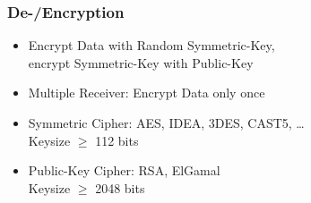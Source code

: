 \documentclass{beamer}
\begin{document}

\begin{frame}

	\frametitle{De-/Encryption}


	\begin{itemize}
		\item Encrypt Data with Random Symmetric-Key,\\ encrypt Symmetric-Key with Public-Key
		\item Multiple Receiver: Encrypt Data only once 
	\end{itemize}
		
	\begin{itemize}
		\item Symmetric Cipher: AES, IDEA, 3DES, CAST5, \ldots  \\
				\small Keysize $\geq$ 112 bits \cite{nist} 
		\item Public-Key Cipher: RSA, ElGamal \\
				\small Keysize $\geq$ 2048 bits \cite{nist} 
	\end{itemize}

\end{frame}

\end{document}
